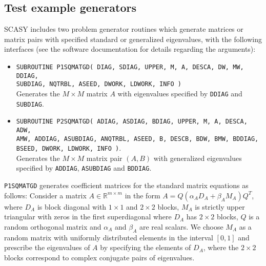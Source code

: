 \documentclass[11pt]{article}
\begin{document}
\subsection{Test example generators}
\label{sec:testexamplegeneration} SCASY includes two problem
generator routines which generate matrices or matrix pairs with
specified standard or generalized eigenvalues, with the following
interfaces (see the software documentation for details regarding
the arguments):
%
\begin{itemize}
\item \texttt{SUBROUTINE P1SQMATGD( DIAG, SDIAG, UPPER, M, A,
DESCA, DW, MW, DDIAG, \\ SUBDIAG, NQTRBL, ASEED, DWORK, LDWORK,
INFO )} \\ Generates the $M \times M$ matrix $A$ with eigenvalues
specified by \texttt{DDIAG} and \texttt{SUBDIAG}. \\

\item \texttt{SUBROUTINE P2SQMATGD( ADIAG, ASDIAG, BDIAG, UPPER,
M, A, DESCA, ADW, \\ AMW, ADDIAG, ASUBDIAG, ANQTRBL, ASEED, B,
DESCB, BDW, BMW, BDDIAG, \\ BSEED, DWORK, LDWORK, INFO )}. \\
Generates the $M \times M$ matrix pair $(A,B)$ with generalized
eigenvalues specified by \texttt{ADDIAG}, \texttt{ASUBDIAG} and
\texttt{BDDIAG}.
\end{itemize}
%

\texttt{P1SQMATGD} generates coefficient matrices for the standard
matrix equations as follows: Consider a matrix $A \in
\mathbb{R}^{m \times m}$ in the form $A=Q( \alpha_A D_A+ \beta_A
M_A )Q^T$, where $D_A$ is block diagonal with $1 \times 1$ and $2
\times 2$ blocks, $M_A$ is strictly upper triangular with zeros in
the first superdiagonal where $D_A$ has $2 \times 2$ blocks, $Q$
is a random orthogonal matrix and $\alpha_A$ and $\beta_A$ are
real scalars. We choose $M_A$ as a random matrix with uniformly
distributed elements in the interval $[0,1]$ and prescribe the
eigenvalues of $A$ by specifying the elements of $D_A$, where the
$2 \times 2$ blocks correspond to complex conjugate pairs of
eigenvalues.
%
\end{document}
